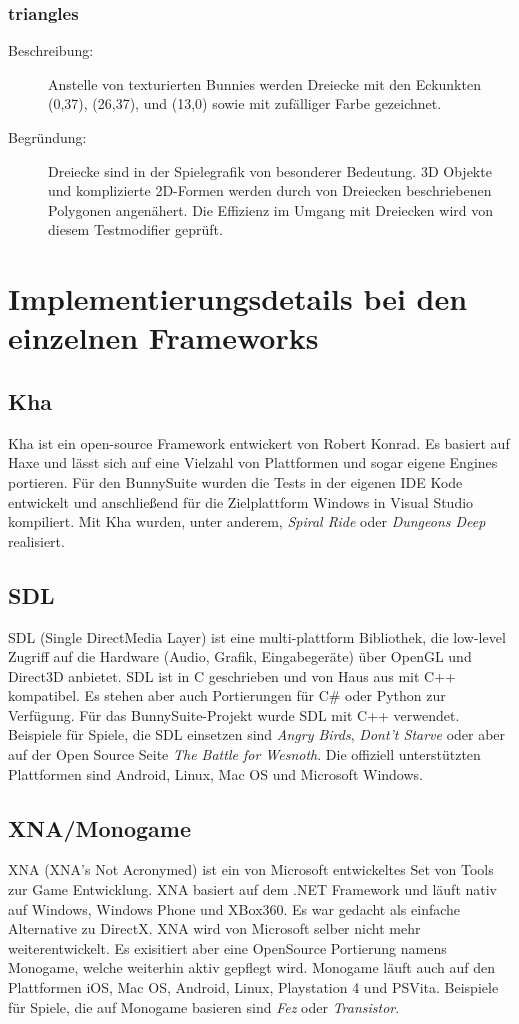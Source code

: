\subsubsection{triangles}
\begin{description}
\item[Beschreibung:] Anstelle von texturierten Bunnies werden Dreiecke mit den Eckunkten (0,37), (26,37), und (13,0) sowie mit zufälliger Farbe gezeichnet. \\
\item[Begründung:] Dreiecke sind in der Spielegrafik von besonderer Bedeutung. 3D Objekte und komplizierte 2D-Formen werden durch von Dreiecken beschriebenen Polygonen angenähert. Die Effizienz im Umgang mit Dreiecken wird von diesem Testmodifier geprüft.
\end{description}

\section{Implementierungsdetails bei den einzelnen Frameworks}
\subsection{Kha}
Kha ist ein open-source Framework entwickert von Robert Konrad. Es basiert auf Haxe und lässt sich auf eine Vielzahl von Plattformen und sogar eigene Engines portieren. Für den BunnySuite wurden die Tests in der eigenen IDE Kode entwickelt und anschließend für die Zielplattform Windows in Visual Studio kompiliert. Mit Kha wurden, unter anderem,  \emph{Spiral Ride} oder \emph{Dungeons Deep} realisiert.

\subsection{SDL}
SDL (Single DirectMedia Layer) ist eine multi-plattform Bibliothek, die low-level Zugriff auf die Hardware (Audio, Grafik, Eingabegeräte) über OpenGL und Direct3D anbietet. SDL ist in C geschrieben und von Haus aus mit C++ kompatibel. Es stehen aber auch Portierungen für C\# oder Python zur Verfügung. Für das BunnySuite-Projekt wurde SDL mit C++ verwendet. Beispiele für Spiele, die SDL einsetzen sind \emph{Angry Birds}, \emph{Dont't Starve} oder aber auf der Open Source Seite \emph{The Battle for Wesnoth}. Die offiziell unterstützten Plattformen sind Android, Linux, Mac OS und Microsoft Windows.

\subsection{XNA/Monogame}
XNA (XNA's Not Acronymed) ist ein von Microsoft entwickeltes Set von Tools zur Game Entwicklung. XNA basiert auf dem .NET Framework und läuft nativ auf Windows, Windows Phone und XBox360. Es war gedacht als einfache Alternative zu DirectX. XNA wird von Microsoft selber nicht mehr weiterentwickelt. Es exisitiert aber eine OpenSource Portierung namens Monogame, welche weiterhin aktiv gepflegt wird. Monogame läuft auch auf den Plattformen iOS, Mac OS, Android, Linux, Playstation 4 und PSVita. Beispiele für Spiele, die auf Monogame basieren sind \emph{Fez} oder \emph{Transistor}.

